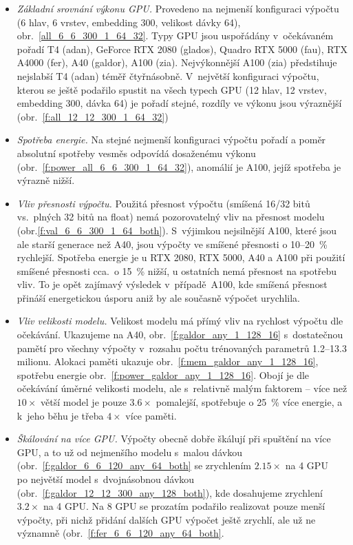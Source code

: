 \documentclass[a4paper,11pt]{article}
\begin{document}
\begin{itemize}
\item \emph{Základní srovnání výkonu GPU.} Provedeno na nejmenší konfiguraci
výpočtu (6 hlav, 6 vrstev, embedding 300, velikost dávky 64),
obr.~\ref{all_6_6_300_1_64_32}. 
Typy GPU jsou uspořádány v~očekávaném pořadí
T4 (adan), GeForce RTX 2080 (glados), Quadro RTX 5000 (fau), RTX A4000 (fer), A40
(galdor), A100 (zia).
Nejvýkonnější A100 (zia) předstihuje nejslabší T4 (adan) téměř čtyřnásobně.  
V~největší konfiguraci výpočtu, kterou se ještě podařilo spustit na všech typech GPU (12 hlav, 12 vrstev, embedding 300, dávka 64) je pořadí stejné, rozdíly ve výkonu jsou výraznější (obr.~\ref{f:all_12_12_300_1_64_32})

\item \emph{Spotřeba energie.} Na stejné nejmenší konfiguraci výpočtu pořadí a poměr absolutní spotřeby vesměs
odpovídá dosaženému výkonu (obr.~\ref{f:power_all_6_6_300_1_64_32}), anomálií je A100, jejíž spotřeba je výrazně nižší.

\item \emph{Vliv přesnosti výpočtu.} Použitá přesnost výpočtu (smíšená 16/32 bitů vs.\ plných 32 bitů na float)
nemá pozorovatelný vliv na přesnost modelu (obr.\ref{f:val_6_6_300_1_64_both}).
S~výjimkou nejsilnější A100, které jsou ale starší generace než A40, jsou výpočty ve smíšené přesnosti o 10--20~\% rychlejší.
Spotřeba energie je u RTX 2080, RTX 5000, A40 a A100 při použití smíšené přesnosti cca.\ o 15~\% nižší, u ostatních nemá
přesnost na spotřebu vliv.
To je opět zajímavý výsledek v~případě~A100, kde smíšená přesnost přináší energetickou úsporu aniž by ale současně
výpočet urychlila.

\item \emph{Vliv velikosti modelu.}
Velikost modelu má přímý vliv na rychlost výpočtu dle očekávání. Ukazujeme na A40, obr.~\ref{f:galdor_any_1_128_16}
s~dostatečnou pamětí pro všechny výpočty v~rozsahu počtu trénovaných parametrů 1.2--13.3 milionu.
Alokaci paměti ukazuje obr.~\ref{f:mem_galdor_any_1_128_16}, spotřebu energie obr.~\ref{f:power_galdor_any_1_128_16}.
Obojí je dle očekávání úměrné velikosti modelu, ale s~relativně malým faktorem -- více než $10\times$ větší model je pouze
$3.6\times$ pomalejší, spotřebuje o 25~\% více energie, a k~jeho běhu je třeba $4\times$ více paměti.

\item \emph{Škálování na více GPU.}
Výpočty obecně dobře škálují při spuštění na více GPU, a to už od nejmenšího modelu s~malou dávkou (obr.~\ref{f:galdor_6_6_120_any_64_both} se zrychlením $2.15\times$ na 4 GPU    
po největší model s~dvojnásobnou dávkou (obr.~\ref{f:galdor_12_12_300_any_128_both}), kde dosahujeme zrychlení $3.2\times$ na 4 GPU.
Na 8 GPU se prozatím podařilo realizovat pouze menší výpočty, při nichž přidání dalších GPU výpočet ještě zrychlí,
ale už ne významně (obr.~\ref{f:fer_6_6_120_any_64_both}.
\end{itemize}
\end{document}
